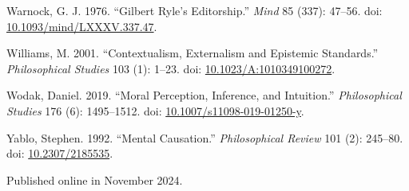 \documentclass[
  10pt,
  letterpaper,
  DIV=11,
  numbers=noendperiod,
  twoside]{scrartcl}
\newlength{\cslhangindent}
\newenvironment{CSLReferences}[2] %
 {\begin{list}{}{%
  \setlength{\itemindent}{0pt}
  \setlength{\leftmargin}{0pt}
  \setlength{\parsep}{0pt}
  \ifodd #1
   \setlength{\leftmargin}{\cslhangindent}
   \setlength{\itemindent}{-1\cslhangindent}
  \fi
  \setlength{\itemsep}{#2\baselineskip}}}
 {\end{list}}
\begin{document}
\begin{CSLReferences}{1}{0}
Warnock, G. J. 1976. {``Gilbert Ryle's Editorship.''} \emph{Mind} 85
(337): 47--56. doi:
\href{https://doi.org/10.1093/mind/LXXXV.337.47}{10.1093/mind/LXXXV.337.47}.

Williams, M. 2001. {``Contextualism, Externalism and Epistemic
Standards.''} \emph{Philosophical Studies} 103 (1): 1--23. doi:
\href{https://doi.org/10.1023/A:1010349100272}{10.1023/A:1010349100272}.

Wodak, Daniel. 2019. {``Moral Perception, Inference, and Intuition.''}
\emph{Philosophical Studies} 176 (6): 1495--1512. doi:
\href{https://doi.org/10.1007/s11098-019-01250-y}{10.1007/s11098-019-01250-y}.

Yablo, Stephen. 1992. {``Mental Causation.''} \emph{Philosophical
Review} 101 (2): 245--80. doi:
\href{https://doi.org/10.2307/2185535}{10.2307/2185535}.

\end{CSLReferences}



\noindent Published online in November 2024.
\end{document}
